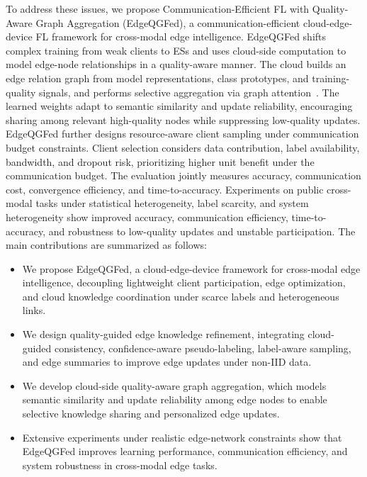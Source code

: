 ﻿\documentclass[10pt, conference, letterpaper]{ IEEEtran}
\begin{document}
To address these issues, we propose Communication-Efficient FL with Quality-Aware Graph Aggregation (EdgeQGFed), a communication-efficient cloud-edge-device FL framework for cross-modal edge intelligence. EdgeQGFed shifts complex training from weak clients to ESs and uses cloud-side computation to model edge-node relationships in a quality-aware manner. The cloud builds an edge relation graph from model representations, class prototypes, and training-quality signals, and performs selective aggregation via graph attention~\cite{velivckovic2017graph}. The learned weights adapt to semantic similarity and update reliability, encouraging sharing among relevant high-quality nodes while suppressing low-quality updates. EdgeQGFed further designs resource-aware client sampling under communication budget constraints. Client selection considers data contribution, label availability, bandwidth, and dropout risk, prioritizing higher unit benefit under the communication budget. The evaluation jointly measures accuracy, communication cost, convergence efficiency, and time-to-accuracy. Experiments on public cross-modal tasks under statistical heterogeneity, label scarcity, and system heterogeneity show improved accuracy, communication efficiency, time-to-accuracy, and robustness to low-quality updates and unstable participation. The main contributions are summarized as follows:

\begin{itemize}
\item [1.] We propose EdgeQGFed, a cloud-edge-device framework for cross-modal edge intelligence, decoupling lightweight client participation, edge optimization, and cloud knowledge coordination under scarce labels and heterogeneous links.

\item [2.] We design quality-guided edge knowledge refinement, integrating cloud-guided consistency, confidence-aware pseudo-labeling, label-aware sampling, and edge summaries to improve edge updates under non-IID data.

\item [3.] We develop cloud-side quality-aware graph aggregation, which models semantic similarity and update reliability among edge nodes to enable selective knowledge sharing and personalized edge updates.

\item [4.] Extensive experiments under realistic edge-network constraints show that EdgeQGFed improves learning performance, communication efficiency, and system robustness in cross-modal edge tasks.
\end{itemize}
\end{document}
